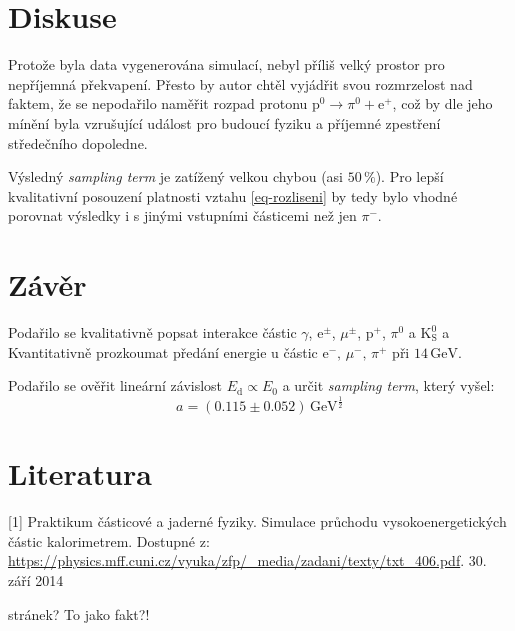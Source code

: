 \documentclass[10pt,a4paper]{article}
\renewcommand{\U}[1]{\ensuremath{\,\mathrm{#1}}}
\newcommand{\°}{\degree}
\renewcommand{\t}[1]{\mathrm{#1}}
\begin{document}
\section{Diskuse}
Protože byla data vygenerována simulací, nebyl příliš velký prostor pro nepříjemná překvapení. Přesto by autor chtěl vyjádřit svou rozmrzelost nad faktem, že se nepodařilo naměřit rozpad protonu $\t p^0 \to \pi^0 + \t e^+$, což by dle jeho mínění byla vzrušující událost pro budoucí fyziku a příjemné zpestření středečního dopoledne.

Výsledný \textit{sampling term} je zatížený velkou chybou (asi  $50 \,\%$). Pro lepší kvalitativní posouzení platnosti vztahu \eqref{eq-rozliseni} by tedy bylo vhodné porovnat výsledky i s jinými vstupními částicemi než jen $\pi^-$.

\section{Závěr}
Podařilo se kvalitativně popsat interakce částic $\gamma$, ${\mathrm e}^\pm$, $\mu^\pm$, ${\mathrm p}^+$, $\pi^0$ a ${\mathrm K}_{\mathrm S}^0$ a Kvantitativně prozkoumat předání energie u částic $\t e^- \!,\, \mu^- \!,\, \pi^+$ při $14 \U{GeV}$.

Podařilo se ověřit lineární závislost $E_{\mathrm d} \propto E_0$ a určit \textit{sampling term}, který vyšel:
\begin{equation*}
    a = (0.115 \pm 0.052) \U{GeV^{\frac{1}{2}}}
\end{equation*}


\section{Literatura}
[1] Praktikum částicové a jaderné fyziky. Simulace průchodu vysokoenergetických částic kalorimetrem. Dostupné z: \url{https://physics.mff.cuni.cz/vyuka/zfp/_media/zadani/texty/txt_406.pdf}. 30. září 2014

\vspace{12\baselineskip}

 stránek? To jako fakt?!
\end{document}

